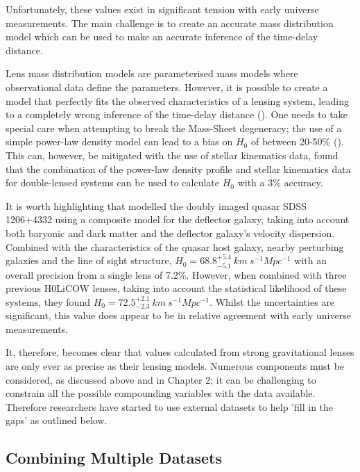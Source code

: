 \documentclass[12pt]{report}
\begin{document}
Unfortunately, these values exist in significant tension with early universe measurements. The main challenge is to create an accurate mass distribution model which can be used to make an accurate inference of the time-delay distance. 

Lens mass distribution models are parameterised mass models where observational data define the parameters. However, it is possible to create a model that perfectly fits the observed characteristics of a lensing system, leading to a completely wrong inference of the time-delay distance (\textcite{Bonvin2017}). One needs to take special care when attempting to break the Mass-Sheet degeneracy; the use of a simple power-law density model can lead to a bias on $H_{0}$ of between 20-50\% (\textcite{Xu2016}). This can, however, be mitigated with the use of stellar kinematics data, \textcite{Sonnenfeld2018} found that the combination of the power-law density profile and stellar kinematics data for double-lensed systems can be used to calculate $H_{0}$ with a 3\% accuracy.

It is worth highlighting that \textcite{Birrer2019} modelled the doubly imaged quasar SDSS 1206+4332 using a composite model for the deflector galaxy, taking into account both baryonic and dark matter and the deflector galaxy's velocity dispersion. Combined with the characteristics of the quasar host galaxy, nearby perturbing galaxies and the line of sight structure, $H_{0} = 68.8^{+5.4}_{-5.1}  \ km \ s^{-1} Mpc^{-1}$ with an overall precision from a single lens of 7.2\%. However, when combined with three previous H0LiCOW lenses, taking into account the statistical likelihood of these systems, they found $H_{0} = 72.5^{+2.1}_{-2.3} \ km \ s^{-1} Mpc^{-1}$. Whilst the uncertainties are significant, this value does appear to be in relative agreement with early universe measurements.

It, therefore, becomes clear that values calculated from strong gravitational lenses are only ever as precise as their lensing models. Numerous components must be considered, as discussed above and in Chapter 2; it can be challenging to constrain all the possible compounding variables with the data available. Therefore researchers have started to use external datasets to help 'fill in the gaps' as outlined below. 

\newpage

\subsection{Combining Multiple Datasets}
\end{document}
